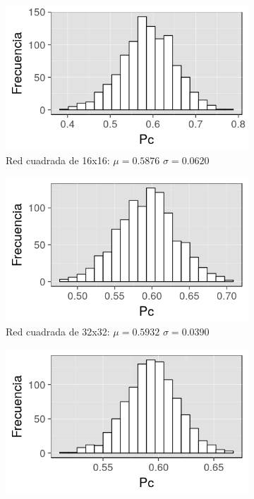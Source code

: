 \documentclass[%
 reprint,
 amsmath,amssymb,
 aps,
spanish]{revtex4-1}
\begin{document}
\begin{figure}[h]
\begin{subfigure}{.25\textwidth}
  \centering
  \includegraphics[width=.9\linewidth]{ej1a/hist16x16}
  \caption{Red cuadrada de 16x16: $\mu=0.5876$ $\sigma=0.0620$}
  \label{fig:1a16x16}
\end{subfigure}%
\begin{subfigure}{.25\textwidth}
  \centering
  \includegraphics[width=.9\linewidth]{ej1a/hist32x32}
  \caption{Red cuadrada de 32x32: $\mu=0.5932$ $\sigma=0.0390$}
  \label{fig:1a32x32}
\end{subfigure}
\begin{subfigure}{.25\textwidth}
  \centering
  \includegraphics[width=.9\linewidth]{ej1a/hist64x64}

\end{subfigure}
\end{figure}
\end{document}
